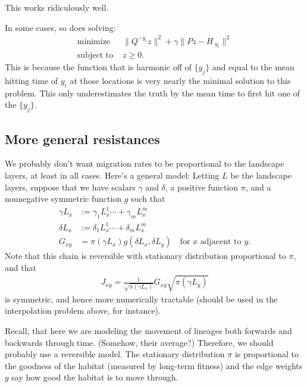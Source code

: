 \documentclass{article}
\begin{document}
This works ridiculously well.

In some cases, so does solving:
\begin{align}
    \text{minimize } & \| Q^{-y_i} z \|^2 + \gamma \| Pz - H_{\cdot y_i} \|^2 \\
    \text{subject to } &  z \ge 0 .
\end{align}
This is because the function that is harmonic off of $\{y_j\}$
and equal to the mean hitting time of $y_i$ at those locations
is very nearly the minimal solution to this problem.
This only underestimates the truth by the mean time to first hit one of the $\{y_j\}$.




\subsection*{More general resistances}

We probably don't want migration rates to be proportional to the landscape layers,
at least in all cases.
Here's a general model:
Letting $L$ be the landscape layers,
suppose that we have scalars $\gamma$ and $\delta$, a positive function $\pi$, and a nonnegative symmetric function $g$ such that
\begin{align}
  \gamma L_x &:= \gamma_1 L^1_x \cdots + \gamma_m L^m_x  \\
  \delta L_x &:= \delta_1 L^1_x \cdots + \delta_m L^m_x  \\
  G_{xy} &= \pi( \gamma L_x ) g( \delta L_x, \delta L_y ) \quad \text{for $x$ adjacent to $y$.}
\end{align}
Note that this chain is reversible with stationary distribution proportional to $\pi$,
and that
\begin{align}
  J_{xy} = \frac{1}{\sqrt{\pi(\gamma L_x)}} G_{xy} \sqrt{ \pi(\gamma L_y) }
\end{align}
is symmetric, and hence more numerically tractable (should be used in the interpolation problem above, for instance).

Recall, that here we are modeling the movement of lineages both forwards and backwards through time.
(Somehow, their average?)
Therefore, we should probably use a reversible model.
The stationary distribution $\pi$ is proportional to the goodness of the habitat
(measured by long-term fitness)
and the edge weights $g$ say how good the habitat is to move through.
\end{document}
